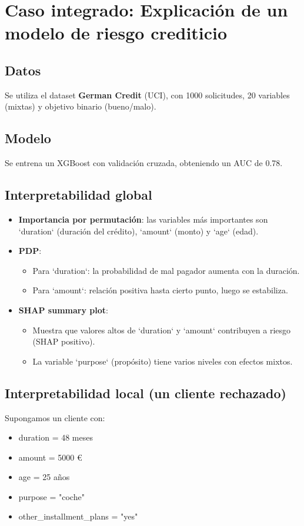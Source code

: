 \documentclass[12pt,a4paper,openany,oneside]{book}
\begin{document}
\section{Caso integrado: Explicación de un modelo de riesgo crediticio}

\subsection{Datos}
Se utiliza el dataset \textbf{German Credit} (UCI), con 1000 solicitudes, 20 variables (mixtas) y objetivo binario (bueno/malo).

\subsection{Modelo}
Se entrena un XGBoost con validación cruzada, obteniendo un AUC de 0.78.

\subsection{Interpretabilidad global}
\begin{itemize}
    \item \textbf{Importancia por permutación}: las variables más importantes son `duration` (duración del crédito), `amount` (monto) y `age` (edad).
    \item \textbf{PDP}:
        \begin{itemize}
            \item Para `duration`: la probabilidad de mal pagador aumenta con la duración.
            \item Para `amount`: relación positiva hasta cierto punto, luego se estabiliza.
        \end{itemize}
    \item \textbf{SHAP summary plot}:
        \begin{itemize}
            \item Muestra que valores altos de `duration` y `amount` contribuyen a riesgo (SHAP positivo).
            \item La variable `purpose` (propósito) tiene varios niveles con efectos mixtos.
        \end{itemize}
\end{itemize}

\subsection{Interpretabilidad local (un cliente rechazado)}
Supongamos un cliente con:
\begin{itemize}
    \item duration = 48 meses
    \item amount = 5000 €
    \item age = 25 años
    \item purpose = "coche"
    \item other\_installment\_plans = "yes"
\end{itemize}
\end{document}
